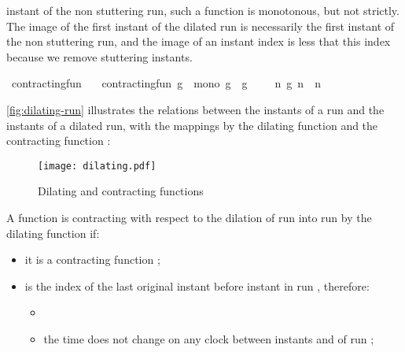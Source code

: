 \begin{isabellebody}
\begin{isamarkuptext}
  instant of the non stuttering run, such a function is monotonous, but not strictly.
  The image of the first instant of the dilated run is necessarily the first instant
  of the non stuttering run, and the image of an instant index is less that this 
  index because we remove stuttering instants.%
\end{isamarkuptext}\isamarkuptrue%
\isamarkupfalse%
\ contracting{\isacharunderscore}fun\isanewline
\ \ \ {\isacartoucheopen}contracting{\isacharunderscore}fun\ g\ {\isasymequiv}\ mono\ g\ {\isasymand}\ g\ {}\ {\isacharequal}\ {}\ {\isasymand}\ {\isacharparenleft}{\isasymforall}n{\isachardot}\ g\ n\ {\isasymle}\ n{\isacharparenright}{\isacartoucheclose}%
\begin{isamarkuptext}%
\autoref{fig:dilating-run} illustrates the relations between the instants of 
  a run and the instants of a dilated run, with the mappings by the dilating 
  function  and the contracting function :
  \begin{figure}
    \centering
    \texttt{[image: dilating.pdf]}
    \caption{Dilating and contracting functions}\label{fig:dilating-run}
  \end{figure}%
\end{isamarkuptext}\isamarkuptrue%
%
\begin{isamarkuptext}%
A function  is contracting with respect to the dilation of run
 into run  by the dilating function  if:

%
\begin{itemize}%
\item it is a contracting function ;

\item {} is the index of the last original instant before instant 
 in run , therefore:

%
\begin{itemize}%
\item {}

\item the time does not change on any clock between instants 
and  of run ;


\end{itemize}
\end{itemize}
\end{isamarkuptext}
\end{isabellebody}
